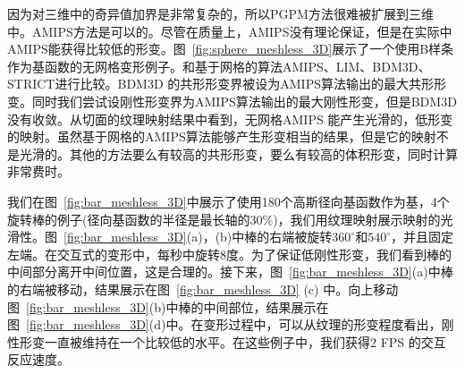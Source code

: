 因为对三维中的奇异值加界是非常复杂的，所以PGPM方法很难被扩展到三维中。AMIPS方法是可以的。尽管在质量上，AMIPS没有理论保证，但是在实际中AMIPS能获得比较低的形变。图~\ref{fig:sphere_meshless_3D}展示了一个使用B样条作为基函数的无网格变形例子。和基于网格的算法AMIPS、LIM、BDM3D、STRICT进行比较。BDM3D 的共形形变界被设为AMIPS算法输出的最大共形形变。同时我们尝试设刚性形变界为AMIPS算法输出的最大刚性形变，但是BDM3D没有收敛。从切面的纹理映射结果中看到，无网格AMIPS 能产生光滑的，低形变的映射。虽然基于网格的AMIPS算法能够产生形变相当的结果，但是它的映射不是光滑的。其他的方法要么有较高的共形形变，要么有较高的体积形变，同时计算非常费时。

我们在图~\ref{fig:bar_meshless_3D}中展示了使用180个高斯径向基函数作为基，4个旋转棒的例子(径向基函数的半径是最长轴的$30\%$)，我们用纹理映射展示映射的光滑性。图~\ref{fig:bar_meshless_3D}(a)，(b)中棒的右端被旋转$360^{\circ}$和$540^{\circ}$，并且固定左端。在交互式的变形中，每秒中旋转$8$度。为了保证低刚性形变，我们看到棒的中间部分离开中间位置，这是合理的。接下来，图~\ref{fig:bar_meshless_3D}(a)中棒的右端被移动，结果展示在图~\ref{fig:bar_meshless_3D} (c) 中。向上移动图~\ref{fig:bar_meshless_3D}(b)中棒的中间部位，结果展示在图~\ref{fig:bar_meshless_3D}(d)中。在变形过程中，可以从纹理的形变程度看出，刚性形变一直被维持在一个比较低的水平。在这些例子中，我们获得2 FPS 的交互反应速度。

